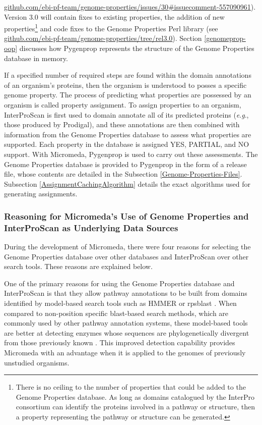 \href{http://github.com/ebi-pf-team/genome-properties/issues/30#issuecomment-557090961}{github.com/ebi-pf-team/genome-properties/issues/30\#issuecomment-557090961}). 
Version 3.0 will contain fixes to existing properties, the addition of new 
properties\footnote{There is no ceiling to the number of properties that could 
be added to the Genome Properties database. As long as domains catalogued by the 
InterPro consortium can identify the proteins involved in a pathway or 
structure, then a property representing the pathway or structure can be 
generated.} and code fixes to the Genome Properties Perl library (see 
\href{http://github.com/ebi-pf-team/genome-properties/tree/rel3.0}{github.com/ebi-pf-team/genome-properties/tree/rel3.0}). 
Section \ref{genomeprop-oop} discusses how Pygenprop represents the structure of 
the Genome Properties database in memory.

If a specified number of required steps are found within the domain annotations 
of an organism's proteins, then the organism is understood to posses a specific 
genome property. The process of predicting what properties are possessed by an 
organism is called property assignment. To assign properties to an organism, 
InterProScan is first used to domain annotate all of its predicted proteins 
(\textit{e}.\textit{g}., those produced by Prodigal), and these annotations are then combined with 
information from the Genome Properties database to assess what properties are 
supported. Each property in the database is assigned YES, PARTIAL, and NO 
support. With Micromeda, Pygenprop is used to carry out these assessments. The 
Genome Properties database is provided to Pygenprop in the form of a release 
file, whose contents are detailed in the Subsection \ref{Genome-Properties-Files}. 
Subsection \ref{AssignmentCachingAlgorithm} details the exact algorithms used
for generating assignments.

\subsubsection{Reasoning for Micromeda's Use of Genome Properties and 
InterProScan as Underlying Data Sources} 

During the development of Micromeda, there were four reasons for selecting the 
Genome Properties database over other databases and InterProScan over other 
search tools. These reasons are explained below.

One of the primary reasons for using the Genome Properties database and 
InterProScan is that they allow pathway annotations to be built from domains 
identified by model-based search tools such as HMMER \cite{eddy2011accelerated} 
or \gls{rpsblast} \cite{mcginnis2004blast}. When compared to non-position
specific \gls{blast}-based \cite{altschul1990basic} search methods, which are 
commonly used by other pathway annotation systems, these model-based tools are 
better at detecting enzymes whose sequences are phylogenetically divergent from 
those previously known \cite{eddy2011accelerated}. This improved detection 
capability provides Micromeda with an advantage when it is applied to the 
genomes of previously unstudied organisms.

